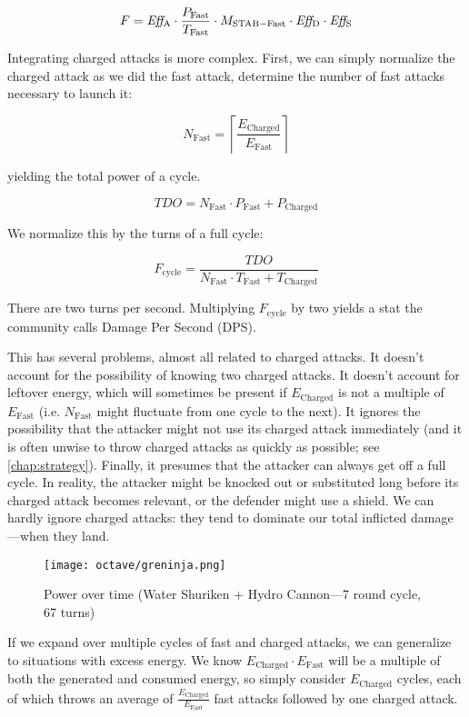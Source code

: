   \[ F = \mbox{$\mathit{Eff_\mathrm{A}}$} \cdot \frac{P_\mathrm{Fast}}{T_\mathrm{Fast}} \cdot M_\mathrm{STAB-Fast} \cdot \mbox{$\mathit{Eff_\mathrm{D}}$} \cdot \mbox{$\mathit{Eff_\mathrm{S}}$} \]

Integrating charged attacks is more complex.
First, we can simply normalize the charged attack as we did the fast attack,
 determine the number of fast attacks necessary to launch it:

\[ N_\mathrm{Fast} = \left\lceil\frac{E_\mathrm{Charged}}{E_\mathrm{Fast}}\right\rceil \]

yielding the total power of a cycle.

\[ \mathit{TDO} = N_\mathrm{Fast} \cdot P_\mathrm{Fast} + P_\mathrm{Charged} \]

We normalize this by the turns of a full cycle:

\[ F_\mathrm{cycle} = \frac{\mathit{TDO}}{N_\mathrm{Fast} \cdot T_\mathrm{Fast} + T_\mathrm{Charged}} \]

There are two turns per second.
Multiplying $F_\mathrm{cycle}$ by two yields a stat the community calls Damage Per Second (DPS).

This has several problems, almost all related to charged attacks.
It doesn't account for the possibility of knowing two charged attacks.
It doesn't account for leftover energy, which will sometimes be present if
  $E_\mathrm{Charged}$ is not a multiple of $E_\mathrm{Fast}$ (i.e. $N_\mathrm{Fast}$
  might fluctuate from one cycle to the next).
It ignores the possibility that the attacker might not use its charged attack
  immediately (and it is often unwise to throw charged attacks as quickly as
  possible; see \autoref{chap:strategy}).
Finally, it presumes that the attacker can always get off a full cycle.
In reality, the attacker might be knocked out or substituted long before its
  charged attack becomes relevant, or the defender might use a shield.
We can hardly ignore charged attacks: they tend to dominate our total inflicted damage---when they land.

\begin{figure}[ht]
  \centering
  \texttt{[image: octave/greninja.png]}
  \caption[Power over time]{Power over time (Water Shuriken + Hydro Cannon---7 round cycle, 67 turns)}
\end{figure}

If we expand over multiple cycles of fast and charged attacks, we can
 generalize to situations with excess energy. We know $E_\mathrm{Charged} \cdot
 E_\mathrm{Fast}$ will be a multiple of both the generated and consumed energy, so
 simply consider $E_\mathrm{Charged}$ cycles, each of which throws an average of
 $\frac{E_\mathrm{Charged}}{E_\mathrm{Fast}}$ fast attacks followed by one charged attack.

